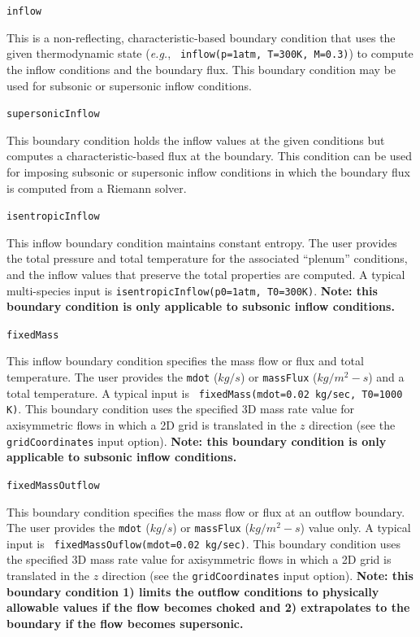 \documentclass{article}
\begin{document}
  \begin{list}{}{}

    
  \item {\tt inflow}

    This is a non-reflecting, characteristic-based boundary condition
    that uses the given thermodynamic state ({\it{e.g.}}, {\tt
      inflow(p=1atm, T=300K, M=0.3)}) to
    compute the inflow conditions and the boundary flux.  This
    boundary condition may be used for subsonic or supersonic inflow
    conditions.
    
  \item {\tt supersonicInflow}

    This boundary condition holds the inflow values at the given
    conditions but computes a characteristic-based flux at the
    boundary.  This condition can be used for imposing subsonic or
    supersonic inflow conditions in which the boundary flux is
    computed from a Riemann solver.

  \item {\tt isentropicInflow}

    This inflow boundary condition maintains constant entropy.  The
    user provides the total pressure and total temperature for the
    associated ``plenum'' conditions, and the inflow values that
    preserve the total properties are computed.  A typical
    multi-species input is {\tt isentropicInflow(p0=1atm, T0=300K)}.
    {\bf Note: this boundary condition is only applicable to subsonic
      inflow conditions.}

  \item {\tt fixedMass}

    This inflow boundary condition specifies the mass flow or flux
    and total temperature.  The user provides the
    {\tt mdot} ($kg/s$) or {\tt massFlux} ($kg/m^2-s$) and
    a total temperature.  A typical input is {\tt
    fixedMass(mdot=0.02 kg/sec, T0=1000 K)}.  This boundary condition
    uses the specified 3D mass rate value for axisymmetric flows in which a 2D grid
    is translated in the $z$ direction (see the {\tt gridCoordinates} input option).  {\bf Note:
    this boundary condition is only applicable to subsonic inflow conditions.}

  \item {\tt fixedMassOutflow}

    This boundary condition specifies the mass flow or flux
    at an outflow boundary.  The user provides the
    {\tt mdot} ($kg/s$) or {\tt massFlux} ($kg/m^2-s$) value only.  A typical input is {\tt
    fixedMassOuflow(mdot=0.02 kg/sec)}.  This boundary condition
    uses the specified 3D mass rate value for axisymmetric flows in which a 2D grid
    is translated in the $z$ direction (see the {\tt gridCoordinates} input option).  {\bf Note:
    this boundary condition 1) limits the outflow conditions to physically allowable values if the flow
    becomes choked and 2) extrapolates to the boundary if the flow becomes supersonic.}


\end{list}
\end{document}
